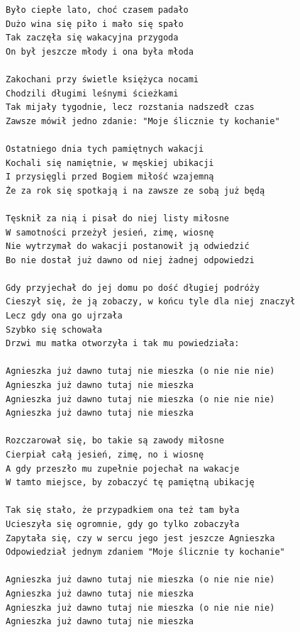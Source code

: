 \documentclass[12pt]{article}
\begin{document}
\begin{verbatim}
Było ciepłe lato, choć czasem padało
Dużo wina się piło i mało się spało
Tak zaczęła się wakacyjna przygoda
On był jeszcze młody i ona była młoda

Zakochani przy świetle księżyca nocami
Chodzili długimi leśnymi ścieżkami
Tak mijały tygodnie, lecz rozstania nadszedł czas
Zawsze mówił jedno zdanie: "Moje ślicznie ty kochanie"

Ostatniego dnia tych pamiętnych wakacji
Kochali się namiętnie, w męskiej ubikacji
I przysięgli przed Bogiem miłość wzajemną
Że za rok się spotkają i na zawsze ze sobą już będą

Tęsknił za nią i pisał do niej listy miłosne
W samotności przeżył jesień, zimę, wiosnę
Nie wytrzymał do wakacji postanowił ją odwiedzić
Bo nie dostał już dawno od niej żadnej odpowiedzi

Gdy przyjechał do jej domu po dość długiej podróży
Cieszył się, że ją zobaczy, w końcu tyle dla niej znaczył
Lecz gdy ona go ujrzała
Szybko się schowała
Drzwi mu matka otworzyła i tak mu powiedziała:

Agnieszka już dawno tutaj nie mieszka (o nie nie nie)
Agnieszka już dawno tutaj nie mieszka
Agnieszka już dawno tutaj nie mieszka (o nie nie nie)
Agnieszka już dawno tutaj nie mieszka

Rozczarował się, bo takie są zawody miłosne
Cierpiał całą jesień, zimę, no i wiosnę
A gdy przeszło mu zupełnie pojechał na wakacje
W tamto miejsce, by zobaczyć tę pamiętną ubikację

Tak się stało, że przypadkiem ona też tam była
Ucieszyła się ogromnie, gdy go tylko zobaczyła
Zapytała się, czy w sercu jego jest jeszcze Agnieszka
Odpowiedział jednym zdaniem "Moje ślicznie ty kochanie"

Agnieszka już dawno tutaj nie mieszka (o nie nie nie)
Agnieszka już dawno tutaj nie mieszka
Agnieszka już dawno tutaj nie mieszka (o nie nie nie)
Agnieszka już dawno tutaj nie mieszka
\end{verbatim}
\clearpage
\end{document}
